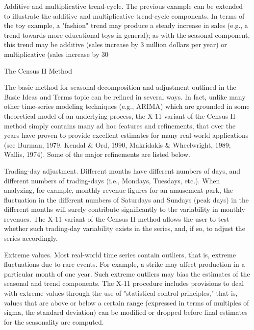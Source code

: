 Additive and multiplicative trend-cycle. The previous example can be extended to illustrate the additive and multiplicative trend-cycle components. In terms of the toy example, a "fashion" trend may produce a steady increase in sales (e.g., a trend towards more educational toys in general); as with the seasonal component, this trend may be additive (sales increase by 3 million dollars per year) or multiplicative (sales increase by 30%

The Census II Method

The basic method for seasonal decomposition and adjustment outlined in the Basic Ideas and Terms topic can be refined in several ways. In fact, unlike many other time-series modeling techniques (e.g., ARIMA) which are grounded in some theoretical model of an underlying process, the X-11 variant of the Census II method simply contains many ad hoc features and refinements, that over the years have proven to provide excellent estimates for many real-world applications (see Burman, 1979, Kendal & Ord, 1990, Makridakis & Wheelwright, 1989; Wallis, 1974). Some of the major refinements are listed below.

Trading-day adjustment. Different months have different numbers of days, and different numbers of trading-days (i.e., Mondays, Tuesdays, etc.). When analyzing, for example, monthly revenue figures for an amusement park, the fluctuation in the different numbers of Saturdays and Sundays (peak days) in the different months will surely contribute significantly to the variability in monthly revenues. The X-11 variant of the Census II method allows the user to test whether such trading-day variability exists in the series, and, if so, to adjust the series accordingly.

Extreme values. Most real-world time series contain outliers, that is, extreme fluctuations due to rare events. For example, a strike may affect production in a particular month of one year. Such extreme outliers may bias the estimates of the seasonal and trend components. The X-11 procedure includes provisions to deal with extreme values through the use of "statistical control principles," that is, values that are above or below a certain range (expressed in terms of multiples of sigma, the standard deviation) can be modified or dropped before final estimates for the seasonality are computed.

